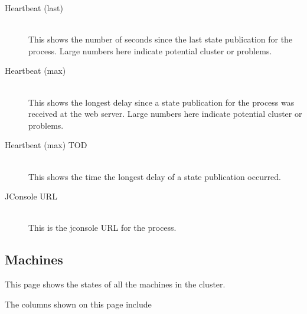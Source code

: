 \begin{description}
      \item[Heartbeat (last)] \hfill \\ 
        This shows the number of seconds since the last state publication for the process. 
         Large numbers here indicate potential cluster or {\DUCC} problems.

      \item[Heartbeat (max)] \hfill \\ 
        This shows the longest delay since a state publication for the process was received
        at the web server.  Large numbers here indicate potential cluster or {\DUCC} problems.

      \item[Heartbeat (max) TOD] \hfill \\ 
        This shows the time the longest delay of a state publication occurred.

      \item[JConsole URL] \hfill \\ 
        This is the jconsole URL for the process.

   \end{description}
      
\subsection{Machines}

This page shows the states of all the machines in the {\DUCC} cluster.

The columns shown on this page include


